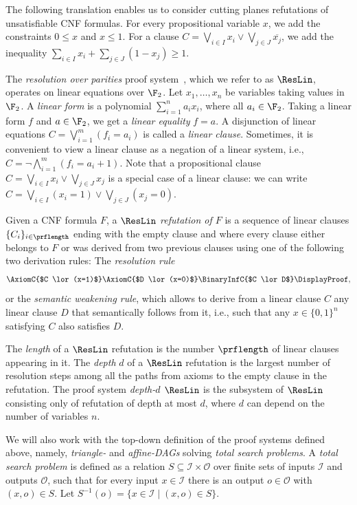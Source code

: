 The following translation enables us to consider cutting planes refutations of unsatisfiable CNF formulas.  
For every propositional variable $x$, we add the constraints $0\leq x$ and $x\leq 1$. For a clause $C=\bigvee_{i\in I}x_i\lor\bigvee_{j\in J} \overline{x_j}$, we add the inequality $\sum_{i\in I} x_i + \sum_{j\in J} (1-x_j) \geq 1$.

The \emph{resolution over parities} proof system~\cite{IS20ResLin}, which we refer to as $\ResLin$, operates on linear equations over $\F_2$.
Let $x_1, \dots, x_n$ be variables taking values in $\F_2$. A \emph{linear form} is a polynomial $\sum_{i=1}^n a_ix_i$, where all $a_i\in \F_2$. Taking a linear form $f$ and $a\in \F_2$, we get a \emph{linear equality} $f=a$. 
A disjunction of linear equations $C=\bigvee_{i=1}^m (f_i=a_i)$ is called a \emph{linear clause}. Sometimes, it is convenient to view a linear clause as a negation of a linear system, i.e., $C=\lnot \bigwedge_{i=1}^m (f_i = a_i+1)$. 
Note that a propositional clause $C=\bigvee_{i\in I}x_i\lor\bigvee_{j\in J}x_j$ is a special case of a linear clause: we can write $C=\bigvee_{i\in I} (x_i=1) \lor \bigvee_{j\in J}(x_j=0)$.

Given a CNF formula $F$, a \emph{$\ResLin$ refutation 
of $F$} is a sequence of linear clauses $\{C_i\}_{i\in\prflength}$ ending with the empty clause and where every clause either belongs to $F$ or was derived from two previous clauses using one of the following two derivation rules:  The \emph{resolution rule}
\begin{equation*}
  \AxiomC{$C \lor (x=1)$}
  \AxiomC{$D \lor (x=0)$}
  \BinaryInfC{$C \lor D$}
  \DisplayProof ,
\end{equation*}
or the \emph{semantic weakening rule}, which allows to derive from a linear clause $C$ any linear clause $D$ that semantically follows from it, i.e., such that any $x\in \{0,1\}^n$ satisfying $C$ also satisfies $D$.  

The \emph{length} of a $\ResLin$ refutation is the number $\prflength$ of linear clauses appearing in it. The \emph{depth} $d$ of a $\ResLin$ refutation is the largest number of resolution steps among all the paths from axioms to the empty clause in the refutation.
The proof system \emph{depth-$d$ $\ResLin$} is the subsystem of $\ResLin$ consisting only of refutation of depth at most $d$, where $d$ can depend on the number of variables $n$.

We will also work with the top-down definition of the proof systems defined above, namely, \emph{triangle-} and \emph{affine-DAGs} solving \emph{total search problems}. 
A \emph{total search problem} is defined as a relation $S\subseteq \mathcal{I} \times \mathcal{O}$ over finite sets of inputs $\mathcal{I}$ and outputs $\mathcal{O}$, such that for every input $x\in \mathcal{I}$ there is an output $o\in \mathcal{O}$ with $(x,o)\in S$. Let $S^{-1}(o)= \{x\in \mathcal{I} \mid (x,o) \in S \}$.


